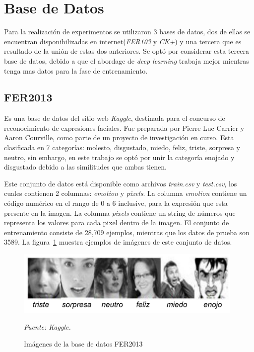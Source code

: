 \section{Base de Datos}
Para la realización de experimentos se utilizaron 3 bases de datos, dos de ellas se encuentran disponibilizadas en internet(\textit{FER103} y \textit{CK+}) y una tercera que es resultado de la unión de estas dos anteriores. Se optó por considerar esta tercera base de datos, debido a que el abordage de \textit{deep learning} trabaja mejor mientras tenga mas datos para la fase de entrenamiento.
 
\subsection{FER2013}
\label{subsec:fer2013}
Es una base de datos del sitio web \textit{Kaggle}, destinada para el concurso de reconocimiento de expresiones faciales. Fue preparada por Pierre-Luc Carrier y Aaron Courville, como parte de un proyecto de investigación en curso. Esta clasificada en 7 categorías: molesto, disgustado, miedo, feliz, triste, sorpresa y neutro, sin embargo, en este trabajo se optó por unir la categoría enojado y disgustado debido a las similitudes que ambas tienen.

Este conjunto de datos está disponible como archivos \textit{train.csv} y \textit{test.csv}, los cuales contienen 2 columnas: \textit{emotion} y \textit{pixels}. La columna \textit{emotion} contiene un código numérico en el rango de 0 a 6 inclusive, para la expresión que esta presente en la imagen. La columna \textit{pixels} contiene un string de números que representa los valores para cada pixel dentro de la imagen. El conjunto de entrenamiento consiste de 28,709 ejemplos, mientras que los datos de prueba son 3589. La figura~\ref{fig:imagenes_fer} muestra ejemplos de imágenes de este conjunto de datos.


\begin{figure}[H]
		\centering
		\includegraphics[width=110mm]{Imagenes/imagenes_fer.pdf}
		\caption{Imágenes de la base de datos FER2013}
		\vspace{0.15cm}
		\textit{Fuente: Kaggle.}
		\label{fig:imagenes_fer}
\end{figure}

